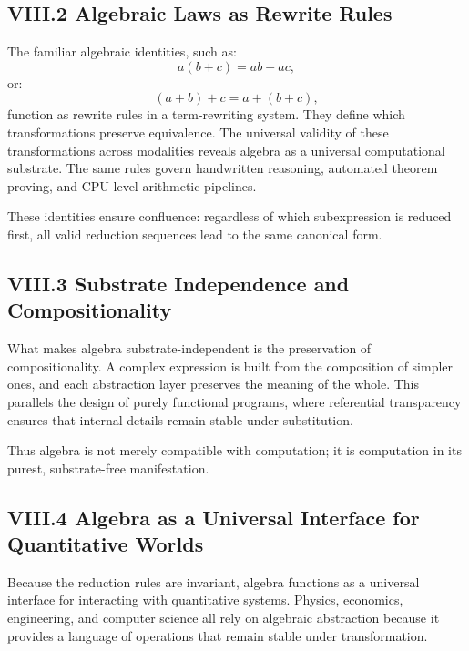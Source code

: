 \documentclass[11pt,letterpaper]{article}
\begin{document}
\subsection{VIII.2 Algebraic Laws as Rewrite Rules}

The familiar algebraic identities, such as:
\[
a(b + c) = ab + ac,
\]
or:
\[
(a + b) + c = a + (b + c),
\]
function as rewrite rules in a term-rewriting system. They define which transformations preserve equivalence. The universal validity of these transformations across modalities reveals algebra as a universal computational substrate. The same rules govern handwritten reasoning, automated theorem proving, and CPU-level arithmetic pipelines.

These identities ensure confluence: regardless of which subexpression is reduced first, all valid reduction sequences lead to the same canonical form.

\subsection{VIII.3 Substrate Independence and Compositionality}

What makes algebra substrate-independent is the preservation of compositionality. A complex expression is built from the composition of simpler ones, and each abstraction layer preserves the meaning of the whole. This parallels the design of purely functional programs, where referential transparency ensures that internal details remain stable under substitution.

Thus algebra is not merely compatible with computation; it is computation in its purest, substrate-free manifestation.

\subsection{VIII.4 Algebra as a Universal Interface for Quantitative Worlds}

Because the reduction rules are invariant, algebra functions as a universal interface for interacting with quantitative systems. Physics, economics, engineering, and computer science all rely on algebraic abstraction because it provides a language of operations that remain stable under transformation.
\end{document}
